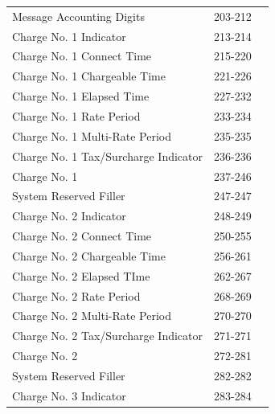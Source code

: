 \documentclass[12pt,twoside]{article}
\begin{document}
\begin{longtable}{lrr}
 Message Accounting Digits                 &            203-212  &                        \\
 Charge No. 1 Indicator                    &            213-214  &                        \\
 Charge No. 1 Connect Time                 &            215-220  &                        \\
 Charge No. 1 Chargeable Time              &            221-226  &                        \\
 Charge No. 1 Elapsed Time                 &            227-232  &                        \\
 Charge No. 1 Rate Period                  &            233-234  &                        \\
 Charge No. 1 Multi-Rate Period            &            235-235  &                        \\
 Charge No. 1 Tax/Surcharge Indicator      &            236-236  &                        \\
 Charge No. 1                              &            237-246  &                        \\
 System Reserved Filler                    &            247-247  &                        \\
 Charge No. 2 Indicator                    &            248-249  &                        \\
 Charge No. 2 Connect Time                 &            250-255  &                        \\
 Charge No. 2 Chargeable Time              &            256-261  &                        \\
 Charge No. 2 Elapsed TIme                 &            262-267  &                        \\
 Charge No. 2 Rate Period                  &            268-269  &                        \\
 Charge No. 2 Multi-Rate Period            &            270-270  &                        \\
 Charge No. 2 Tax/Surcharge Indicator      &            271-271  &                        \\
 Charge No. 2                              &            272-281  &                        \\
 System Reserved Filler                    &            282-282  &                        \\
 Charge No. 3 Indicator                    &            283-284  &                        \\

\end{longtable}
\end{document}
